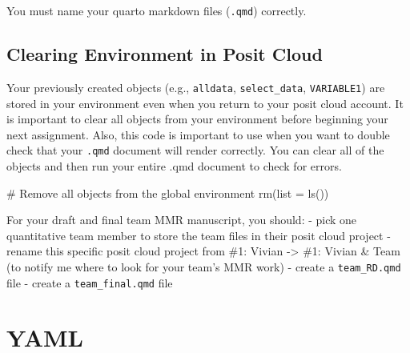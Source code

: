 \documentclass[
  english,
  letterpaper,
  DIV=11,
  numbers=noendperiod]{scrreprt}
\newenvironment{Shaded}{\begin{snugshade}}{\end{snugshade}}
\newcommand{\AttributeTok}[1]{\textcolor[rgb]{0.40,0.45,0.13}{#1}}
\newcommand{\CommentTok}[1]{\textcolor[rgb]{0.37,0.37,0.37}{#1}}
\newcommand{\FunctionTok}[1]{\textcolor[rgb]{0.28,0.35,0.67}{#1}}
\newcommand{\NormalTok}[1]{\textcolor[rgb]{0.00,0.23,0.31}{#1}}
\begin{document}
\begin{tcolorbox}[enhanced jigsaw, title=\textcolor{quarto-callout-important-color}{\faExclamation}\hspace{0.5em}{Requirement}, opacityback=0, colframe=quarto-callout-important-color-frame, rightrule=.15mm, left=2mm, toprule=.15mm, leftrule=.75mm, titlerule=0mm, bottomtitle=1mm, breakable, arc=.35mm, toptitle=1mm, bottomrule=.15mm, coltitle=black, opacitybacktitle=0.6, colback=white, colbacktitle=quarto-callout-important-color!10!white]

You must name your quarto markdown files (\texttt{.qmd}) correctly.

\end{tcolorbox}

\section{Clearing Environment in Posit
Cloud}\label{clearing-environment-in-posit-cloud}

Your previously created objects (e.g., \texttt{alldata},
\texttt{select\_data}, \texttt{VARIABLE1}) are stored in your
environment even when you return to your posit cloud account. It is
important to clear all objects from your environment before beginning
your next assignment. Also, this code is important to use when you want
to double check that your \texttt{.qmd} document will render correctly.
You can clear all of the objects and then run your entire .qmd document
to check for errors.

\begin{Shaded}
\begin{Highlighting}[]
\CommentTok{\# Remove all objects from the global environment}
\FunctionTok{rm}\NormalTok{(}\AttributeTok{list =} \FunctionTok{ls}\NormalTok{())}
\end{Highlighting}
\end{Shaded}

For your draft and final team MMR manuscript, you should: - pick one
quantitative team member to store the team files in their posit cloud
project - rename this specific posit cloud project from \#1: Vivian
-\textgreater{} \#1: Vivian \& Team (to notify me where to look for your
team's MMR work) - create a \texttt{team\_RD.qmd} file - create a
\texttt{team\_final.qmd} file

\chapter{YAML}\label{yaml}
\end{document}
